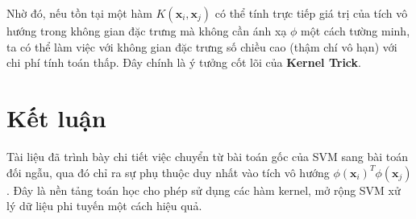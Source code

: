 \documentclass[12pt,a4paper]{article}
\theoremstyle{definition}
\theoremstyle{remark}
\begin{document}
Nhờ đó, nếu tồn tại một hàm $K(\mathbf{x}_i, \mathbf{x}_j)$ có thể tính trực tiếp giá trị của tích vô hướng trong không gian đặc trưng mà không cần ánh xạ $\phi$ một cách tường minh, ta có thể làm việc với không gian đặc trưng số chiều cao (thậm chí vô hạn) với chi phí tính toán thấp. Đây chính là ý tưởng cốt lõi của \textbf{Kernel Trick}.

\section*{Kết luận}
Tài liệu đã trình bày chi tiết việc chuyển từ bài toán gốc của SVM sang bài toán đối ngẫu, qua đó chỉ ra sự phụ thuộc duy nhất vào tích vô hướng $\phi(\mathbf{x}_i)^T \phi(\mathbf{x}_j)$. Đây là nền tảng toán học cho phép sử dụng các hàm kernel, mở rộng SVM xử lý dữ liệu phi tuyến một cách hiệu quả.
\end{document}
